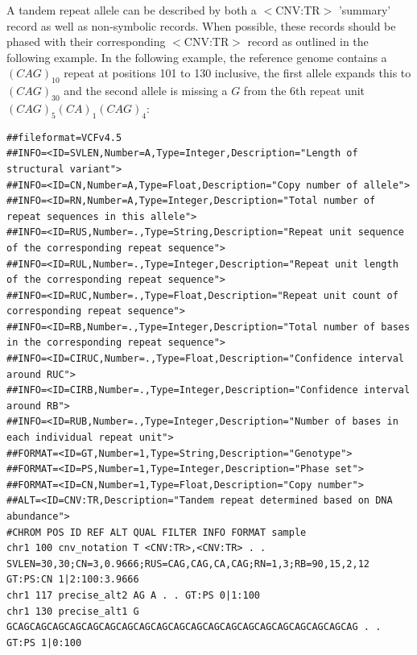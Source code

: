 \documentclass[8pt]{article}
\begin{document}
A tandem repeat allele can be described by both a $<$CNV:TR$>$ 'summary' record as well as non-symbolic records.
When possible, these records should be phased with their corresponding $<$CNV:TR$>$ record as outlined in the following example.
In the following example, the reference genome contains a $(CAG)_{10}$ repeat at positions 101 to 130 inclusive, the first allele expands this to $(CAG)_{30}$ and the second allele is missing a $G$ from the 6th repeat unit $(CAG)_{5}(CA)_{1}(CAG)_{4}$:

\pagebreak
\footnotesize
\begin{landscape}
\begin{verbatim}
##fileformat=VCFv4.5
##INFO=<ID=SVLEN,Number=A,Type=Integer,Description="Length of structural variant">
##INFO=<ID=CN,Number=A,Type=Float,Description="Copy number of allele">
##INFO=<ID=RN,Number=A,Type=Integer,Description="Total number of repeat sequences in this allele">
##INFO=<ID=RUS,Number=.,Type=String,Description="Repeat unit sequence of the corresponding repeat sequence">
##INFO=<ID=RUL,Number=.,Type=Integer,Description="Repeat unit length of the corresponding repeat sequence">
##INFO=<ID=RUC,Number=.,Type=Float,Description="Repeat unit count of corresponding repeat sequence">
##INFO=<ID=RB,Number=.,Type=Integer,Description="Total number of bases in the corresponding repeat sequence">
##INFO=<ID=CIRUC,Number=.,Type=Float,Description="Confidence interval around RUC">
##INFO=<ID=CIRB,Number=.,Type=Integer,Description="Confidence interval around RB">
##INFO=<ID=RUB,Number=.,Type=Integer,Description="Number of bases in each individual repeat unit">
##FORMAT=<ID=GT,Number=1,Type=String,Description="Genotype">
##FORMAT=<ID=PS,Number=1,Type=Integer,Description="Phase set">
##FORMAT=<ID=CN,Number=1,Type=Float,Description="Copy number">
##ALT=<ID=CNV:TR,Description="Tandem repeat determined based on DNA abundance">
#CHROM POS ID REF ALT QUAL FILTER INFO FORMAT sample
chr1 100 cnv_notation T <CNV:TR>,<CNV:TR> . . SVLEN=30,30;CN=3,0.9666;RUS=CAG,CAG,CA,CAG;RN=1,3;RB=90,15,2,12  GT:PS:CN 1|2:100:3.9666
chr1 117 precise_alt2 AG A . . GT:PS 0|1:100
chr1 130 precise_alt1 G GCAGCAGCAGCAGCAGCAGCAGCAGCAGCAGCAGCAGCAGCAGCAGCAGCAGCAGCAGCAG . . GT:PS 1|0:100
\end{verbatim}
\end{landscape}
\pagebreak
\normalsize
\end{document}
